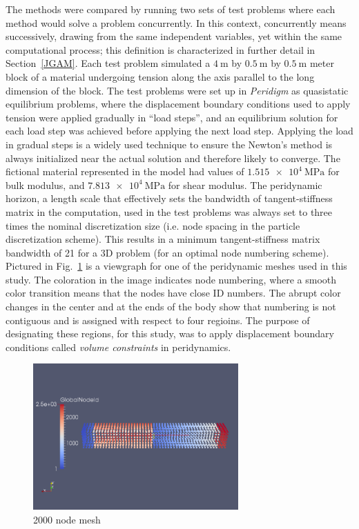 \documentclass[preprint,12pt]{elsarticle}
\begin{document}
The methods were compared by running two sets of test problems where each
method would solve a problem concurrently. In this context, concurrently means
successively, drawing from the same independent variables, yet within the same
computational process; this definition is characterized in further detail in
Section~\ref{JGAM}. Each test problem simulated a $\SI{4}{\meter}$ by
$\SI{0.5}{\meter}$ by $\SI{0.5}{\meter}$ meter block of a material undergoing
tension along the axis parallel to the long dimension of the block. The test
problems were set up in \emph{Peridigm} as quasistatic equilibrium problems,
where the displacement boundary conditions used to apply tension were applied
gradually in ``load steps'', and an equilibrium solution for each load step was
achieved before applying the next load step. Applying the load
in gradual steps is a widely used technique to ensure the Newton's method is
always initialized near the actual solution and therefore likely to converge.
The fictional material represented in the model had values of
$\SI{1.515e4}{\mega\pascal}$ for bulk modulus, and $\SI{7.813e4}{\mega\pascal}$
for shear modulus. The peridynamic horizon, a length scale that effectively
sets the bandwidth of tangent-stiffness matrix in the computation, used in the test
problems was always set to three times the nominal discretization size (i.e.
node spacing in the particle discretization scheme). This results in a minimum
tangent-stiffness matrix bandwidth of 21 for a 3D problem (for an optimal node
numbering scheme). Pictured in Fig.~\ref{fig:SCMesh} is a viewgraph for one of
the peridynamic meshes used in this study. The coloration in the image
indicates node numbering, where a smooth color transition means that the nodes
have close ID numbers. The abrupt color changes in the center and at the ends
of the body show that numbering is not contiguous and is assigned with respect to four regioins. The purpose of designating
these regions, for this study, was to apply displacement boundary
conditions called \emph{volume constraints} in peridynamics. 

\begin{figure}[tbp] \centering \includegraphics[width=0.7\textwidth]{./figs/mesh2000.png}
\caption{2000 node mesh} \label{fig:SCMesh}
\end{figure}
\end{document}
